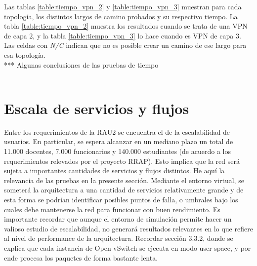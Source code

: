 Las tablas \ref{table:tiempo_vpn_2} y \ref{table:tiempo_vpn_3} muestran para cada topología, los distintos largos de camino probados y su respectivo tiempo. La tabla \ref{table:tiempo_vpn_2} muestra los resultados cuando se trata de una VPN de capa 2, y la tabla \ref{table:tiempo_vpn_3} lo hace cuando es VPN de capa 3. Las celdas con \textit{N/C} indican que no es posible crear un camino de ese largo para esa topología. \\


*** Algunas conclusiones de las pruebas  de tiempo \\ \\

\section{Escala de servicios y flujos}
Entre los requerimientos de la RAU2 se encuentra el de la escalabilidad de usuarios. En particular, se espera alcanzar en un mediano plazo un total de 11.000 docentes, 7.000 funcionarios y 140.000 estudiantes (de acuerdo a los requerimientos relevados por el proyecto RRAP). Esto implica que la red será sujeta a importantes cantidades de servicios y flujos distintos. He aquí la relevancia de las pruebas en la presente sección. Mediante el entorno virtual, se someterá la arquitectura a una cantidad de servicios relativamente grande y de esta forma se podrían identificar posibles puntos de falla, o umbrales bajo los cuales debe mantenerse la red para funcionar con buen rendimiento. Es importante recordar que aunque el entorno de simulación permite hacer un valioso estudio de escalabilidad, no generará resultados relevantes en lo que refiere al nivel de performance de la arquitectura. Recordar sección 3.3.2, donde se explica que cada instancia de Open vSwitch se ejecuta en modo user-space, y por ende procesa los paquetes de forma bastante lenta.

